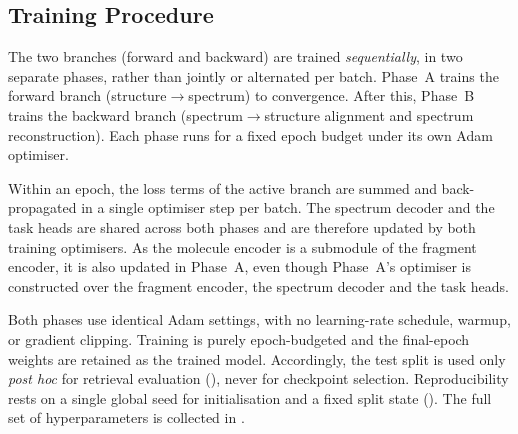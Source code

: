\subsection{Training Procedure}
\label{sec:training-procedure}

The two branches (forward and backward) are trained \emph{sequentially}, in two separate phases, rather than jointly or alternated per batch.
Phase~A trains the forward branch (structure$\rightarrow$spectrum) to convergence.
After this, Phase~B trains the backward branch (spectrum$\rightarrow$structure alignment and spectrum reconstruction).
Each phase runs for a fixed epoch budget under its own Adam optimiser.

Within an epoch, the loss terms of the active branch are summed and back-propagated in a single optimiser step per batch.
The spectrum decoder and the task heads are shared across both phases and are therefore updated by both training optimisers.
As the molecule encoder is a submodule of the fragment encoder, it is also updated in Phase~A, even though Phase~A's optimiser is constructed over the fragment encoder, the spectrum decoder and the task heads.

Both phases use identical Adam settings, with no learning-rate schedule, warmup, or gradient clipping.
Training is purely epoch-budgeted and the final-epoch weights are retained as the trained model.
Accordingly, the test split is used only \emph{post hoc} for retrieval evaluation (), never for checkpoint selection.
Reproducibility rests on a single global seed for initialisation and a fixed split state (). The full set of hyperparameters is collected in .

